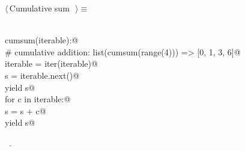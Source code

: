 \documentclass[11pt,oneside]{article}	%
\begin{document}
\begin{flushleft} \small
\begin{minipage}{\linewidth} \label{scrap17}
$\langle\,$Cumulative sum\nobreak\ {\footnotesize {}}$\,\rangle\equiv$
\vspace{-1ex}
\begin{list}{}{} \item
\mbox{}\verb@@\\
\mbox{}\verb@def cumsum(iterable):@\\
\mbox{}\verb@    # cumulative addition: list(cumsum(range(4))) => [0, 1, 3, 6]@\\
\mbox{}\verb@    iterable = iter(iterable)@\\
\mbox{}\verb@    s = iterable.next()@\\
\mbox{}\verb@    yield s@\\
\mbox{}\verb@    for c in iterable:@\\
\mbox{}\verb@        s = s + c@\\
\mbox{}\verb@        yield s@\\
\mbox{}\verb@@{\NWsep}
\end{list}
\vspace{-1ex}
\footnotesize\addtolength{\baselineskip}{-1ex}
\begin{list}{}{\setlength{\itemsep}{-\parsep}\setlength{\itemindent}{-\leftmargin}}
\item \NWtxtMacroRefIn\ .
\end{list}
\end{minipage}\\[4ex]
\end{flushleft}
\end{document}
